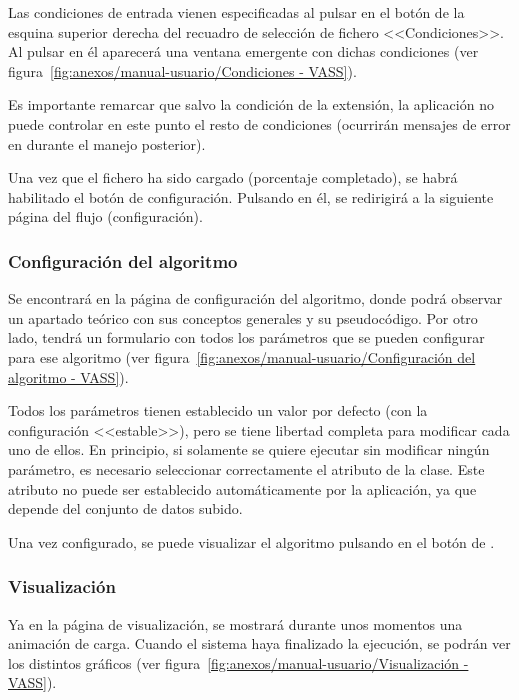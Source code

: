 Las condiciones de entrada vienen especificadas al pulsar en el botón de la
esquina superior derecha del recuadro de selección de fichero <<Condiciones>>.
Al pulsar en él aparecerá una ventana emergente con dichas condiciones (ver
figura~\ref{fig:anexos/manual-usuario/Condiciones - VASS}).


Es importante remarcar que salvo la condición de la extensión, la aplicación no
puede controlar en este punto el resto de condiciones (ocurrirán mensajes de
error en durante el manejo posterior).

Una vez que el fichero ha sido cargado (porcentaje completado), se habrá
habilitado el botón de configuración. Pulsando en él, se redirigirá a la
siguiente página del flujo (configuración).

\subsubsection{Configuración del algoritmo}
\label{mu:configuracion}
Se encontrará en la página de configuración del algoritmo, donde podrá observar
un apartado teórico con sus conceptos generales y su pseudocódigo. Por otro
lado, tendrá un formulario con todos los parámetros que se pueden configurar
para ese algoritmo (ver figura~\ref{fig:anexos/manual-usuario/Configuración del
algoritmo - VASS}).


Todos los parámetros tienen establecido un valor por defecto (con la
configuración <<estable>>), pero se tiene libertad completa para modificar cada
uno de ellos. En principio, si solamente se quiere ejecutar sin modificar ningún
parámetro, es necesario seleccionar correctamente el atributo de la clase.
Este atributo no puede ser establecido automáticamente por la aplicación, ya que
depende del conjunto de datos subido. 

Una vez configurado, se puede visualizar el algoritmo pulsando en el botón de
.

\subsubsection{Visualización}
\label{mu:visualizacion}
Ya en la página de visualización, se mostrará durante unos momentos una
animación de carga. Cuando el sistema haya finalizado la ejecución, se podrán
ver los distintos gráficos (ver
figura~\ref{fig:anexos/manual-usuario/Visualización - VASS}).

